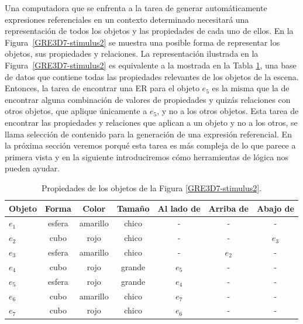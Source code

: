 Una computadora que se enfrenta a la tarea de generar autom\'aticamente expresiones referenciales en un contexto determinado necesitar\'a una representaci\'on de todos los objetos y las propiedades de cada uno de ellos. En la Figura~\ref{GRE3D7-stimulus2} se muestra una posible forma de representar los objetos, sus propiedades y relaciones. La representaci\'on ilustrada en la Figura~\ref{GRE3D7-stimulus2} es equivalente a la mostrada en la Tabla \ref{tabla-propiedades}, una base de datos que contiene todas
las propiedades relevantes de los objetos de la escena. Entonces, la tarea de encontrar una ER para el objeto $e_5$ es la misma que la de encontrar alguna combinaci\'on de valores de propiedades y quiz\'as relaciones con otros objetos, que aplique \'unicamente a $e_5$, y no a los otros objetos. Esta tarea de encontrar las propiedades y relaciones que aplican a un objeto y no a los otros, se llama selecci\'on de contenido para la generaci\'on de una expresi\'on referencial. En la pr\'oxima secci\'on veremos porqu\'e esta tarea es m\'as compleja de lo que parece a primera vista y en la siguiente introduciremos c\'omo herramientas de l\'ogica nos pueden ayudar.


\begin{table}[h!]
\begin{center}
\begin{tabular}{|l|c|c|c|c|c|c|}
\hline
Objeto& 	Forma		&	Color	&	Tama\~no & Al lado de & Arriba de	& Abajo de	\\
\hline
$e_1$ & esfera & amarillo & chico & - & - & -\\
$e_2$ & cubo & rojo & chico & - & - & $e_3$\\
$e_3$ & esfera & amarillo & chico & - & $e_2$ & -\\
$e_4$ & cubo & rojo & grande & $e_5$ & - & -\\
$e_5$ & esfera & rojo & grande & $e_4$ & - & -\\
$e_6$ & cubo & amarillo & chico & $e_7$ & - & -\\
$e_7$ & cubo & rojo & chico & $e_6$ & - & -\\

\hline
\end{tabular}
\caption{Propiedades de los objetos de la Figura \ref{GRE3D7-stimulus2}.}
\vspace*{-.5cm}
\label{tabla-propiedades}
\end{center}
\end{table}

